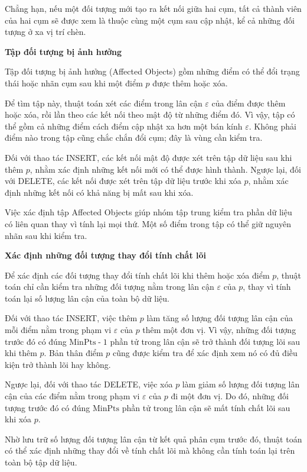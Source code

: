Chẳng hạn, nếu một đối tượng mới tạo ra kết nối giữa hai cụm, tất cả thành viên của hai cụm sẽ được xem là thuộc cùng một cụm sau cập nhật, kể cả những đối tượng ở xa vị trí chèn.

\textbf{Tập đối tượng bị ảnh hưởng}

Tập đối tượng bị ảnh hưởng (Affected Objects) gồm những điểm có thể đổi trạng thái hoặc nhãn cụm sau khi một điểm \(p\) được thêm hoặc xóa.

Để tìm tập này, thuật toán xét các điểm trong lân cận \(\varepsilon\) của điểm được thêm hoặc xóa, rồi lần theo các kết nối theo mật độ từ những điểm đó. Vì vậy, tập có thể gồm cả những điểm cách điểm cập nhật xa hơn một bán kính \(\varepsilon\). Không phải điểm nào trong tập cũng chắc chắn đổi cụm; đây là vùng cần kiểm tra.

Đối với thao tác INSERT, các kết nối mật độ được xét trên tập dữ liệu sau khi thêm \(p\), nhằm xác định những kết nối mới có thể được hình thành. Ngược lại, đối với DELETE, các kết nối được xét trên tập dữ liệu trước khi xóa \(p\), nhằm xác định những kết nối có khả năng bị mất sau khi xóa.

Việc xác định tập Affected Objects giúp nhóm tập trung kiểm tra phần dữ liệu có liên quan thay vì tính lại mọi thứ. Một số điểm trong tập có thể giữ nguyên nhãn sau khi kiểm tra.

\textbf{Xác định những đối tượng thay đổi tính chất lõi}

Để xác định các đối tượng thay đổi tính chất lõi khi thêm hoặc xóa điểm \(p\), thuật toán chỉ cần kiểm tra những đối tượng nằm trong lân cận \(\varepsilon\) của \(p\), thay vì tính toán lại số lượng lân cận của toàn bộ dữ liệu.

Đối với thao tác INSERT, việc thêm \(p\) làm tăng số lượng đối tượng lân cận của mỗi điểm nằm trong phạm vi \(\varepsilon\) của \(p\) thêm một đơn vị. Vì vậy, những đối tượng trước đó có đúng \(\mathrm{MinPts}\;\text{-}\;1\) phần tử trong lân cận sẽ trở thành đối tượng lõi sau khi thêm \(p\). Bản thân điểm \(p\) cũng được kiểm tra để xác định xem nó có đủ điều kiện trở thành lõi hay không.

Ngược lại, đối với thao tác DELETE, việc xóa \(p\) làm giảm số lượng đối tượng lân cận của các điểm nằm trong phạm vi \(\varepsilon\) của \(p\) đi một đơn vị. Do đó, những đối tượng trước đó có đúng \(\mathrm{MinPts}\) phần tử trong lân cận sẽ mất tính chất lõi sau khi xóa \(p\).

Nhờ lưu trữ số lượng đối tượng lân cận từ kết quả phân cụm trước đó, thuật toán có thể xác định những thay đổi về tính chất lõi mà không cần tính toán lại trên toàn bộ tập dữ liệu.

